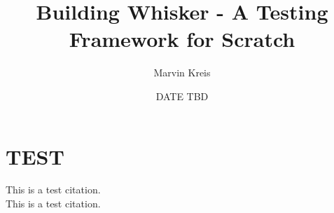 \documentclass[a4paper]{article}
\title{Building Whisker - A Testing Framework for Scratch}
\author{Marvin Kreis}
\date{DATE TBD}
\begin{document}



\maketitle

\tableofcontents
\clearpage




%











\section{TEST}
This is a test\cite{hairball} citation. \\
This is a test\cite{scratch} citation.

\clearpage

{}
\end{document}
